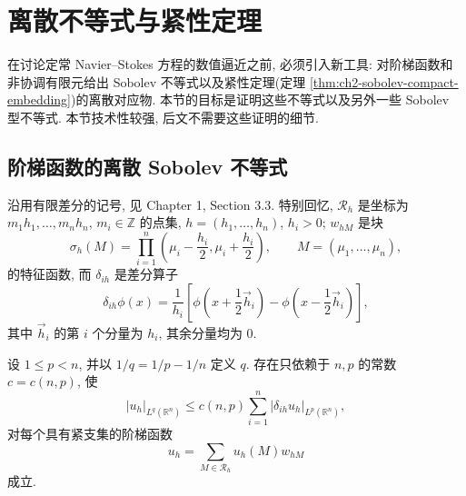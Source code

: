 \hypertarget{chapter-02-page-136}{}
\section{离散不等式与紧性定理}
\label{sec:ch2-discrete-inequalities-compactness}

在讨论定常 Navier--Stokes 方程的数值逼近之前, 必须引入新工具: 对阶梯函数和非协调有限元给出 Sobolev 不等式以及紧性定理(定理 \ref{thm:ch2-sobolev-compact-embedding})的离散对应物. 本节的目标是证明这些不等式以及另外一些 Sobolev 型不等式. 本节技术性较强, 后文不需要这些证明的细节.

\subsection{阶梯函数的离散 Sobolev 不等式}
\label{subsec:ch2-discrete-sobolev-step-functions}

沿用有限差分的记号, 见 Chapter 1, Section 3.3. 特别回忆, $\mathcal R_h$ 是坐标为 $m_1h_1,\ldots,m_nh_n$, $m_i\in\mathbb Z$ 的点集, $h=(h_1,\ldots,h_n)$, $h_i>0$; $w_{hM}$ 是块
\begin{equation}
\sigma_h(M)=\prod_{i=1}^{n}
\left(\mu_i-\frac{h_i}{2},\mu_i+\frac{h_i}{2}\right),
\qquad M=(\mu_1,\ldots,\mu_n),
\label{eq:ch2-step-cell}
\end{equation}
的特征函数, 而 $\delta_{ih}$ 是差分算子
\begin{equation}
\delta_{ih}\phi(x)=\frac1{h_i}
\left[\phi\left(x+\frac12\vec h_i\right)
-\phi\left(x-\frac12\vec h_i\right)\right],
\label{eq:ch2-centered-difference}
\end{equation}
其中 $\vec h_i$ 的第 $i$ 个分量为 $h_i$, 其余分量均为 $0$.

\begin{Theorem}
\label{thm:ch2-discrete-sobolev-step}
设 $1\leq p<n$, 并以 $1/q=1/p-1/n$ 定义 $q$. 存在只依赖于 $n,p$ 的常数 $c=c(n,p)$, 使
\begin{equation}
|u_h|_{L^q(\mathbb R^n)}
\leq c(n,p)\sum_{i=1}^{n}|\delta_{ih}u_h|_{L^p(\mathbb R^n)},
\label{eq:ch2-discrete-sobolev-step-bound}
\end{equation}
对每个具有紧支集的阶梯函数
\begin{equation}
u_h=\sum_{M\in\mathcal R_h}u_h(M)w_{hM}
\label{eq:ch2-step-function-expansion}
\end{equation}
成立.
\end{Theorem}


